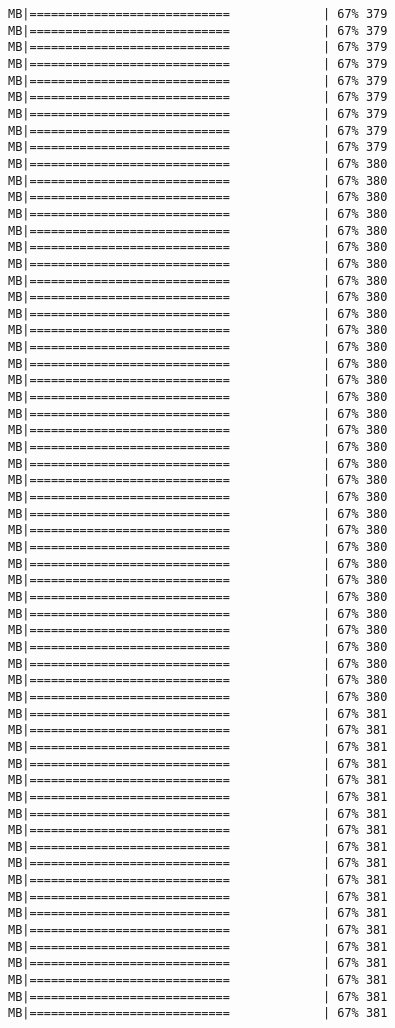 \documentclass[
]{article}
\begin{document}
\begin{verbatim}
MB|============================             | 67% 379 MB|============================             | 67% 379 MB|============================             | 67% 379 MB|============================             | 67% 379 MB|============================             | 67% 379 MB|============================             | 67% 379 MB|============================             | 67% 379 MB|============================             | 67% 379 MB|============================             | 67% 379 MB|============================             | 67% 380 MB|============================             | 67% 380 MB|============================             | 67% 380 MB|============================             | 67% 380 MB|============================             | 67% 380 MB|============================             | 67% 380 MB|============================             | 67% 380 MB|============================             | 67% 380 MB|============================             | 67% 380 MB|============================             | 67% 380 MB|============================             | 67% 380 MB|============================             | 67% 380 MB|============================             | 67% 380 MB|============================             | 67% 380 MB|============================             | 67% 380 MB|============================             | 67% 380 MB|============================             | 67% 380 MB|============================             | 67% 380 MB|============================             | 67% 380 MB|============================             | 67% 380 MB|============================             | 67% 380 MB|============================             | 67% 380 MB|============================             | 67% 380 MB|============================             | 67% 380 MB|============================             | 67% 380 MB|============================             | 67% 380 MB|============================             | 67% 380 MB|============================             | 67% 380 MB|============================             | 67% 380 MB|============================             | 67% 380 MB|============================             | 67% 380 MB|============================             | 67% 380 MB|============================             | 67% 380 MB|============================             | 67% 381 MB|============================             | 67% 381 MB|============================             | 67% 381 MB|============================             | 67% 381 MB|============================             | 67% 381 MB|============================             | 67% 381 MB|============================             | 67% 381 MB|============================             | 67% 381 MB|============================             | 67% 381 MB|============================             | 67% 381 MB|============================             | 67% 381 MB|============================             | 67% 381 MB|============================             | 67% 381 MB|============================             | 67% 381 MB|============================             | 67% 381 MB|============================             | 67% 381 MB|============================             | 67% 381 MB|============================             | 67% 381 MB|============================             | 67% 381 
\end{verbatim}
\end{document}
